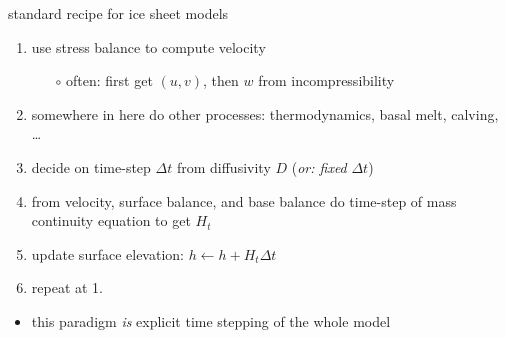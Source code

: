 \begin{frame}{standard recipe for ice sheet models}

\begin{enumerate}
  \item use stress balance to compute velocity
      \begin{itemize}
      \item[$\circ$] often: first get $(u,v)$, then $w$ from incompressibility
      \end{itemize}
  \item somewhere in here do other processes: thermodynamics, basal melt, calving, \dots
  \item decide on time-step $\Delta t$ from diffusivity $D$ \hfill (\emph{or: fixed} $\Delta t$)
  \item from velocity, surface balance, and base balance do time-step of mass continuity equation to get $H_t$
  \item update surface elevation: $h \gets h+H_t \Delta t$
  \item repeat at 1.
\end{enumerate}

\bigskip
\begin{itemize}
\item this paradigm \emph{is} explicit time stepping of the whole model
\end{itemize}
\end{frame}
